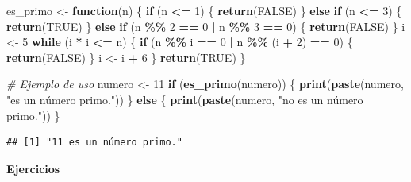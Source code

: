 \documentclass[
]{book}
\newenvironment{Shaded}{\begin{snugshade}}{\end{snugshade}}
\newcommand{\CommentTok}[1]{\textcolor[rgb]{0.56,0.35,0.01}{\textit{#1}}}
\newcommand{\ConstantTok}[1]{\textcolor[rgb]{0.56,0.35,0.01}{#1}}
\newcommand{\ControlFlowTok}[1]{\textcolor[rgb]{0.13,0.29,0.53}{\textbf{#1}}}
\newcommand{\DecValTok}[1]{\textcolor[rgb]{0.00,0.00,0.81}{#1}}
\newcommand{\FunctionTok}[1]{\textcolor[rgb]{0.13,0.29,0.53}{\textbf{#1}}}
\newcommand{\NormalTok}[1]{#1}
\newcommand{\OtherTok}[1]{\textcolor[rgb]{0.56,0.35,0.01}{#1}}
\newcommand{\SpecialCharTok}[1]{\textcolor[rgb]{0.81,0.36,0.00}{\textbf{#1}}}
\newcommand{\StringTok}[1]{\textcolor[rgb]{0.31,0.60,0.02}{#1}}
\begin{document}
\begin{Shaded}
\begin{Highlighting}[]
\NormalTok{es\_primo }\OtherTok{\textless{}{-}} \ControlFlowTok{function}\NormalTok{(n) \{}
  \ControlFlowTok{if}\NormalTok{ (n }\SpecialCharTok{\textless{}=} \DecValTok{1}\NormalTok{) \{}
    \FunctionTok{return}\NormalTok{(}\ConstantTok{FALSE}\NormalTok{)}
\NormalTok{  \} }\ControlFlowTok{else} \ControlFlowTok{if}\NormalTok{ (n }\SpecialCharTok{\textless{}=} \DecValTok{3}\NormalTok{) \{}
    \FunctionTok{return}\NormalTok{(}\ConstantTok{TRUE}\NormalTok{)}
\NormalTok{  \} }\ControlFlowTok{else} \ControlFlowTok{if}\NormalTok{ (n }\SpecialCharTok{\%\%} \DecValTok{2} \SpecialCharTok{==} \DecValTok{0} \SpecialCharTok{|}\NormalTok{ n }\SpecialCharTok{\%\%} \DecValTok{3} \SpecialCharTok{==} \DecValTok{0}\NormalTok{) \{}
    \FunctionTok{return}\NormalTok{(}\ConstantTok{FALSE}\NormalTok{)}
\NormalTok{  \}}
\NormalTok{  i }\OtherTok{\textless{}{-}} \DecValTok{5}
  \ControlFlowTok{while}\NormalTok{ (i }\SpecialCharTok{*}\NormalTok{ i }\SpecialCharTok{\textless{}=}\NormalTok{ n) \{}
    \ControlFlowTok{if}\NormalTok{ (n }\SpecialCharTok{\%\%}\NormalTok{ i }\SpecialCharTok{==} \DecValTok{0} \SpecialCharTok{|}\NormalTok{ n }\SpecialCharTok{\%\%}\NormalTok{ (i }\SpecialCharTok{+} \DecValTok{2}\NormalTok{) }\SpecialCharTok{==} \DecValTok{0}\NormalTok{) \{}
      \FunctionTok{return}\NormalTok{(}\ConstantTok{FALSE}\NormalTok{)}
\NormalTok{    \}}
\NormalTok{    i }\OtherTok{\textless{}{-}}\NormalTok{ i }\SpecialCharTok{+} \DecValTok{6}
\NormalTok{  \}}
  \FunctionTok{return}\NormalTok{(}\ConstantTok{TRUE}\NormalTok{)}
\NormalTok{\}}

\CommentTok{\# Ejemplo de uso}
\NormalTok{numero }\OtherTok{\textless{}{-}} \DecValTok{11}
\ControlFlowTok{if}\NormalTok{ (}\FunctionTok{es\_primo}\NormalTok{(numero)) \{}
  \FunctionTok{print}\NormalTok{(}\FunctionTok{paste}\NormalTok{(numero, }\StringTok{"es un número primo."}\NormalTok{))}
\NormalTok{\} }\ControlFlowTok{else}\NormalTok{ \{}
  \FunctionTok{print}\NormalTok{(}\FunctionTok{paste}\NormalTok{(numero, }\StringTok{"no es un número primo."}\NormalTok{))}
\NormalTok{\}}
\end{Highlighting}
\end{Shaded}

\begin{verbatim}
## [1] "11 es un número primo."
\end{verbatim}

\textbf{Ejercicios}
\end{document}
